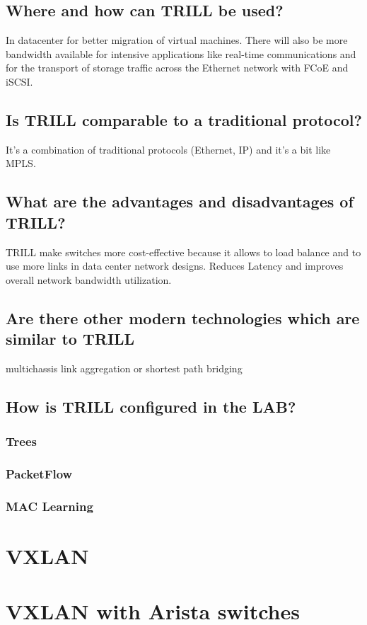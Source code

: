 \documentclass[a4,12pt]{scrartcl}
\begin{document}
\subsection{Where and how can TRILL be used?}
In datacenter for better migration of virtual machines. There will also be more bandwidth available for intensive applications like real-time communications and for the transport of storage traffic across the Ethernet network with FCoE and iSCSI.

\subsection{Is TRILL comparable to a traditional protocol?}It's a combination of traditional protocols (Ethernet, IP) and it's a bit like MPLS.
\subsection{What are the advantages and disadvantages of TRILL?}
TRILL make switches more cost-effective because it allows to load balance and to use more links in data center network designs.
Reduces Latency and improves overall network bandwidth utilization.
\subsection{Are there other modern technologies which are similar to TRILL} multichassis link aggregation or shortest path bridging
\subsection{How is TRILL configured in the LAB?}
\subsubsection{Trees}
\subsubsection{PacketFlow}
\subsubsection{MAC Learning}
\section{VXLAN}
\section{VXLAN with Arista switches}
\end{document}
